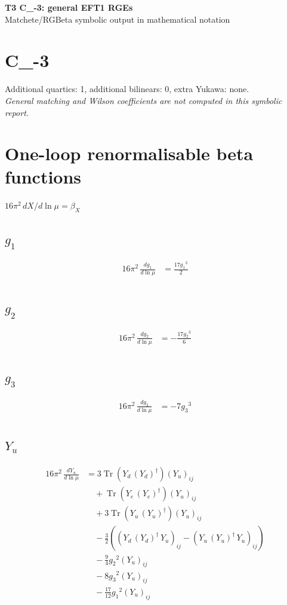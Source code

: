 \documentclass[10pt,a4paper]{article}
\begin{document}
\begin{center}
{\Large\bfseries T3 C\_-3: general EFT1 RGEs}\\[4pt]
Matchete/RGBeta symbolic output in mathematical notation
\end{center}
\bigskip
\section*{C\_-3}
Additional quartics: 1, additional bilinears: 0, extra Yukawa: none.\\
\emph{General matching and Wilson coefficients are not computed in this symbolic report.}
\clearpage
\section*{One-loop renormalisable beta functions}
$16\pi^2\,dX/d\ln\mu=\beta_X$
\subsection*{$g_1$}
\begin{align*}
16\pi^2\,\frac{d g_1}{d\ln\mu} &=\frac{17 {g_1}^3}{2} \\
\end{align*}
\subsection*{$g_2$}
\begin{align*}
16\pi^2\,\frac{d g_2}{d\ln\mu} &=-\frac{17 {g_2}^3}{6} \\
\end{align*}
\subsection*{$g_3$}
\begin{align*}
16\pi^2\,\frac{d g_3}{d\ln\mu} &=-7 {g_3}^3 \\
\end{align*}
\subsection*{$Y_u$}
\begin{align*}
16\pi^2\,\frac{d Y_u}{d\ln\mu} &=3 \operatorname{Tr}\!\left({Y_d}\,\left({Y_d}\right)^{\dagger}\right) \left({Y_u}\right)_{ij} \\
&\quad +\operatorname{Tr}\!\left({Y_e}\,\left({Y_e}\right)^{\dagger}\right) \left({Y_u}\right)_{ij} \\
&\quad +3 \operatorname{Tr}\!\left({Y_u}\,\left({Y_u}\right)^{\dagger}\right) \left({Y_u}\right)_{ij} \\
&\quad -\frac{3}{2} (\left({Y_d}\,\left({Y_d}\right)^{\dagger}\,{Y_u}\right)_{ij}-\left({Y_u}\,\left({Y_u}\right)^{\dagger}\,{Y_u}\right)_{ij}) \\
&\quad -\frac{9}{4} {g_2}^2 \left({Y_u}\right)_{ij} \\
&\quad -8 {g_3}^2 \left({Y_u}\right)_{ij} \\
&\quad -\frac{17}{12} {g_1}^2 \left({Y_u}\right)_{ij} \\
\end{align*}
\end{document}

